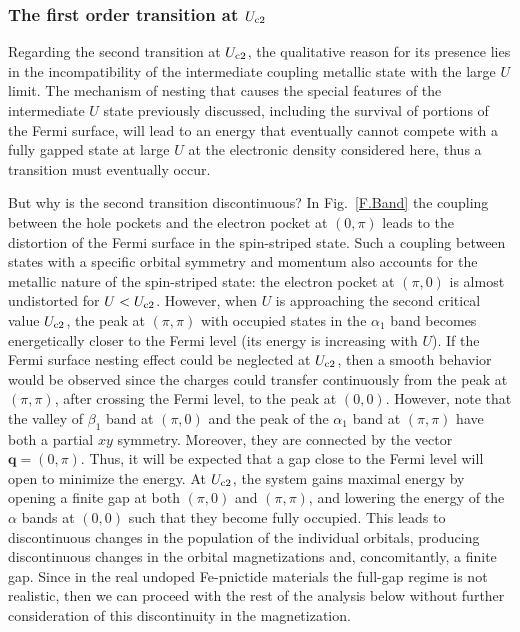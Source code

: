 \documentclass[aps,prb,superscriptaddress,preprintnumbers,
showpacs,legalpaper,twoside,twocolumn,amsmath,amssymb]{revtex4}
\begin{document}
\subsubsection{The first order transition at $U_{\rm c2}$}

Regarding the second transition at $U_{\rm c2}$, the
qualitative reason for its presence lies in the incompatibility of the intermediate
coupling metallic state with the large $U$ limit. The mechanism of nesting that
causes the special features of the intermediate $U$ state previously discussed,
including the survival of portions of the Fermi surface,
will lead to an energy that eventually cannot compete with a fully gapped
state at large $U$ at the electronic density considered here, thus
a transition must eventually occur.


But why is the second transition discontinuous? In Fig.~\ref{F.Band}
the coupling between the hole pockets and the electron pocket
at $(0,\pi)$ leads to the distortion of the Fermi surface in the
spin-striped state. Such a coupling between states with a specific
orbital symmetry and momentum also
accounts for the metallic nature of the spin-striped state: the
electron pocket at $(\pi,0)$ is almost undistorted for $U<U_{\rm c2}$.
However, when $U$ is approaching
the second critical value $U_{\rm c2}$, the peak at $(\pi,\pi)$ with occupied states
in the $\alpha_1$ band becomes
energetically closer to
the Fermi level (its energy is increasing with $U$). If the Fermi surface nesting effect could be
neglected at $U_{\rm c2}$, then a smooth behavior would be observed since
the charges could transfer continuously from
the peak at $(\pi,\pi)$, after crossing the Fermi level,
to the peak at $(0,0)$. However, note that
the valley of $\beta_1$ band at $(\pi,0)$
and the peak of the $\alpha_1$ band at $(\pi,\pi)$ have both a
partial $xy$ symmetry. Moreover, they are connected by the
vector $\mathbf{q}=(0,\pi)$. Thus,  it will be
expected that a gap
close to the Fermi level will open to minimize the energy. At
$U_{\rm c2}$, the system
gains maximal energy by opening a finite gap at both $(\pi,0)$
and $(\pi,\pi)$, and
lowering the energy of
the $\alpha$ bands at $(0,0)$
such that they become
fully occupied. This leads to discontinuous changes in the
population of the individual orbitals, producing discontinuous
changes in the orbital magnetizations and, concomitantly,
a finite gap.
Since in the real undoped Fe-pnictide materials the full-gap regime
is not realistic, then we can proceed with
the rest of the analysis below without further consideration of
this discontinuity in the magnetization.
\end{document}

